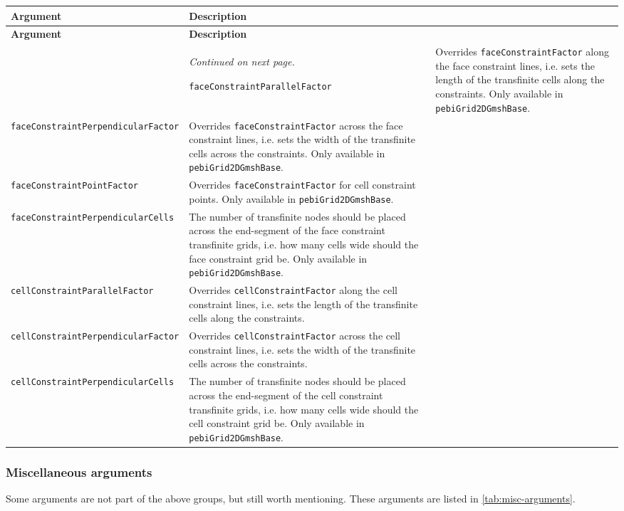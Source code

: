 \begin{tabularx}{\textwidth}{l X}
    \caption{Arguments controlling transfinite grid creation in \texttt{gmsh4mrst}.}
    \label{tab:transfinite-arguments} \\
    \toprule \textbf{Argument} & \textbf{Description} \\\midrule \endfirsthead
    \textbf{Argument} & \textbf{Description} \\\midrule \endhead
    \bottomrule & \textit{Continued on next page.} \endfoot
    \bottomrule \endlastfoot
    
    \texttt{faceConstraintParallelFactor} & Overrides \texttt{faceConstraintFactor} along the face constraint lines, i.e. sets the length of the transfinite cells along the constraints. Only available in \texttt{pebiGrid2DGmshBase}. \\
    \texttt{faceConstraintPerpendicularFactor} & Overrides \texttt{faceConstraintFactor} across the face constraint lines, i.e. sets the width of the transfinite cells across the constraints. Only available in \texttt{pebiGrid2DGmshBase}. \\
    \texttt{faceConstraintPointFactor} & Overrides \texttt{faceConstraintFactor} for cell constraint points. Only available in \texttt{pebiGrid2DGmshBase}. \\
    \texttt{faceConstraintPerpendicularCells} & The number of transfinite nodes should be placed across the end-segment of the face constraint transfinite grids, i.e. how many cells wide should the face constraint grid be. Only available in \texttt{pebiGrid2DGmshBase}. \\
    \texttt{cellConstraintParallelFactor} & Overrides \texttt{cellConstraintFactor} along the cell constraint lines, i.e. sets the length of the transfinite cells along the constraints. \\
    \texttt{cellConstraintPerpendicularFactor} & Overrides \texttt{cellConstraintFactor} across the cell constraint lines, i.e. sets the width of the transfinite cells across the constraints. \\
    \texttt{cellConstraintPerpendicularCells} & The number of transfinite nodes should be placed across the end-segment of the cell constraint transfinite grids, i.e. how many cells wide should the cell constraint grid be. Only available in \texttt{pebiGrid2DGmshBase}. \\
\end{tabularx}


\subsubsection{Miscellaneous arguments}
Some arguments are not part of the above groups, but still worth mentioning. These arguments are listed in \autoref{tab:misc-arguments}.


